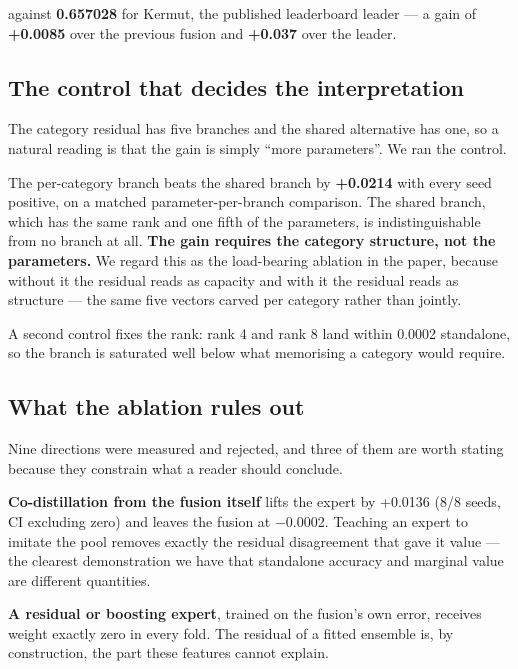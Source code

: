 \documentclass{article}
\begin{document}
against \textbf{0.657028} for Kermut, the published leaderboard leader --- a gain of \textbf{+0.0085} over the
previous fusion and \textbf{+0.037} over the leader.

\subsection{The control that decides the interpretation}\label{the-control-that-decides-the-interpretation}

The category residual has five branches and the shared alternative has one, so a natural reading is that
the gain is simply ``more parameters''. We ran the control.



The per-category branch beats the shared branch by \textbf{+0.0214} with every seed positive, on a matched
parameter-per-branch comparison. The shared branch, which has the same rank and one fifth of the
parameters, is indistinguishable from no branch at all. \textbf{The gain requires the category structure, not
the parameters.} We regard this as the load-bearing ablation in the paper, because without it the
residual reads as capacity and with it the residual reads as structure --- the same five vectors carved
per category rather than jointly.

A second control fixes the rank: rank 4 and rank 8 land within 0.0002 standalone, so the branch is
saturated well below what memorising a category would require.

\subsection{What the ablation rules out}\label{what-the-ablation-rules-out}

Nine directions were measured and rejected, and three of them are worth stating because they constrain
what a reader should conclude.

\textbf{Co-distillation from the fusion itself} lifts the expert by +0.0136 (8/8 seeds, CI excluding zero)
and leaves the fusion at −0.0002. Teaching an expert to imitate the pool removes exactly the residual
disagreement that gave it value --- the clearest demonstration we have that standalone accuracy and
marginal value are different quantities.

\textbf{A residual or boosting expert}, trained on the fusion's own error, receives weight exactly zero in
every fold. The residual of a fitted ensemble is, by construction, the part these features cannot
explain.
\end{document}
